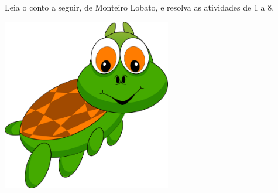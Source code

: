 
Leia o conto a seguir, de Monteiro Lobato, e resolva as atividades de 1 a 8.



\includegraphics[width=2.90902in,height=2.95828in]{./media/image19.png}

